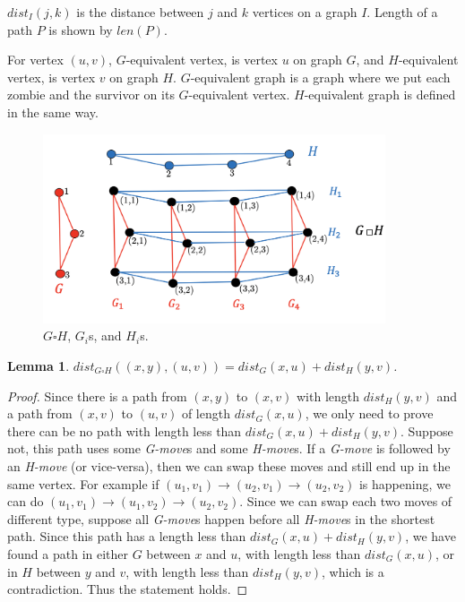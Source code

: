 \documentclass[1p]{elsarticle}
\newtheorem{lemma}[theorem]{Lemma}
\begin{document}
$dist_I(j,k)$ is the distance between $j$ and $k$ vertices on a graph $I$. Length of a path $P$ is shown by $len(P)$. 

For vertex $(u,v)$, $G$-equivalent vertex, is vertex $u$ on graph $G$, and $H$-equivalent vertex, is vertex $v$ on graph
$H$. $G$-equivalent graph is a graph where we put each zombie and the survivor on its $G$-equivalent vertex.
$H$-equivalent graph is defined in the same way.


\begin{figure}[h!]
	
	\centering
	\includegraphics[width=0.9\textwidth]{cp3.png}
	\caption{$G \square H$, $G_i$s, and $H_i$s.}
	\label{fig:p1}
\end{figure}



\begin{lemma} \label{shortestpathlemma}
	$dist_{G \square H}((x,y),(u,v)) = dist_G(x,u) + dist_H(y,v)$.
\end{lemma}
\begin{proof}
	Since there is a path from $(x,y)$ to $(x,v)$ with length $dist_H(y,v)$ and a path from $(x,v)$ to $(u,v)$ of length
	$dist_G(x,u)$, we only need to prove there can be no path with length less than $dist_G(x,u) + dist_H(y,v)$.
	Suppose not, this path uses some {\it G-move}s and some {\it H-move}s. If a {\it G-move} is followed by an {\it
	H-move} (or vice-versa), then we can swap these moves and still end up in the same vertex. For example if $(u_1,v_1)
	\rightarrow (u_2,v_1) \rightarrow (u_2,v_2)$ is happening, we can do $(u_1,v_1) \rightarrow (u_1,v_2) \rightarrow
	(u_2,v_2)$. Since we can swap each two moves of different type, suppose all {\it G-move}s happen before all {\it
	H-move}s in the shortest path. Since this path has a length less than $dist_G(x,u) + dist_H(y,v)$, we have found a
	path in either $G$ between $x$ and $u$, with length less than $dist_G(x,u)$, or in $H$ between $y$ and $v$, with
	length less than $dist_H(y,v)$, which is a contradiction. Thus the statement holds.
\end{proof}
\end{document}
